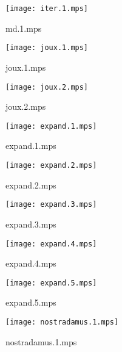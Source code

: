 \documentclass[letterpaper,10pt]{article}
\begin{document}
\begin{figure}
    \centering
    \texttt{[image: iter.1.mps]}
    \caption{md.1.mps}
\end{figure}

\begin{figure}
    \centering
    \texttt{[image: joux.1.mps]}
    \caption{joux.1.mps}
\end{figure}

\begin{figure}
    \centering
    \texttt{[image: joux.2.mps]}
    \caption{joux.2.mps}
\end{figure}

\begin{figure}
    \centering
    \texttt{[image: expand.1.mps]}
    \caption{expand.1.mps}
\end{figure}

\begin{figure}
    \centering
    \texttt{[image: expand.2.mps]}
    \caption{expand.2.mps}
\end{figure}

\begin{figure}
    \centering
    \texttt{[image: expand.3.mps]}
    \caption{expand.3.mps}
\end{figure}

\begin{figure}
    \centering
    \texttt{[image: expand.4.mps]}
    \caption{expand.4.mps}
\end{figure}

\begin{figure}
    \centering
    \texttt{[image: expand.5.mps]}
    \caption{expand.5.mps}
\end{figure}

\begin{figure}
    \centering
    \texttt{[image: nostradamus.1.mps]}
    \caption{nostradamus.1.mps}
\end{figure}
\end{document}
